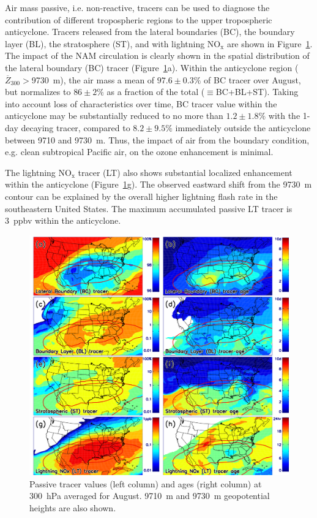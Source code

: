 Air mass passive, i.e. non-reactive, tracers can be used to diagnose the contribution of different tropospheric
regions to the upper tropospheric anticyclone. Tracers released from the lateral
boundaries (BC), the boundary layer (BL), the stratosphere (ST), and with lightning
NO$_{\mathrm{x}}$ are shown in Figure~\ref{fig:tracer}. The impact of the NAM circulation is
clearly shown in the spatial distribution of the lateral boundary (BC) tracer
(Figure~\ref{fig:tracer}a). Within the anticyclone region ($\overline Z_{300}>$9730~m),
the air mass a mean of $97.6\pm0.3\%$ of BC tracer over August, but normalizes
to $86\pm2\%$ as a fraction of the total ($\equiv$BC+BL+ST). Taking into account
loss of characteristics over time, BC tracer value within the anticyclone may be substantially
reduced to no more than $1.2\pm1.8\%$ with the 1-day decaying tracer, compared to
$8.2\pm9.5\%$ immediately outside the anticyclone between 9710 and 9730~m.
Thus, the impact of air from the boundary
condition, e.g. clean subtropical Pacific air, on the ozone enhancement is minimal.

The lightning NO$_{\mathrm{x}}$ tracer (LT) also shows substantial localized
enhancement within the anticyclone (Figure~\ref{fig:tracer}g). The observed eastward
shift from the 9730~m contour can be explained by the overall higher lightning
flash rate in the southeastern United States. The maximum accumulated passive
LT tracer is 3~ppbv within the anticyclone.

 \begin{figure}
 \noindent\includegraphics[width=40pc]{figures/tracer_maps.png}
 \caption{Passive tracer values (left column) and ages (right column) at 300~hPa averaged for August.
9710~m and 9730~m geopotential heights are also shown.}
 \label{fig:tracer}
 \end{figure}

